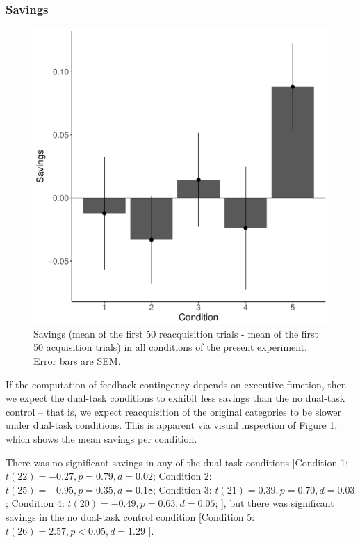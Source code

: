 \documentclass[apacite,draftfirst,man]{apa6}
\begin{document}
\subsubsection*{Savings}
\begin{figure}[t]
\centering \includegraphics[width=1.0\textwidth]{../figures/fig_savings.pdf}
\caption{Savings (mean of the first 50 reacquisition trials - mean of the first
  50 acquisition trials) in all conditions of the present experiment.
  Error bars are SEM.}
  \label{fig:savings}
\end{figure}

If the computation of feedback contingency depends on executive function, then
we expect the dual-task conditions to exhibit less savings than the no dual-task
control -- that is, we expect reacquisition of the original categories to be
slower under dual-task conditions. This is apparent via visual inspection of
Figure \ref{fig:savings}, which shows the mean savings per condition.

There was no significant savings in any of the dual-task conditions [Condition
1: $t(22) = -0.27, p = 0.79, d = 0.02$; Condition 2: $t(25) = -0.95, p = 0.35, d
= 0.18$; Condition 3: $t(21) = 0.39, p = 0.70, d = 0.03$; Condition 4: $t(20) =
-0.49, p = 0.63, d = 0.05$; ], but there was significant savings in the no
dual-task control condition [Condition 5: $t(26) = 2.57, p < 0.05, d = 1.29$ ].
\end{document}
